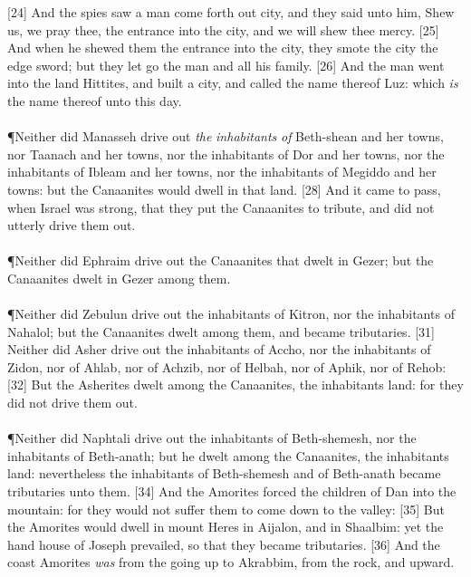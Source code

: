 [24] \textcolor[cmyk]{0.99998,1,0,0}{And the spies saw a man come forth out  city, and they said unto him, Shew us, we pray thee, the entrance into the city, and we will shew thee mercy.}
[25] \textcolor[cmyk]{0.99998,1,0,0}{And when he shewed them the entrance into the city, they smote the city  the edge  sword; but they let go the man and all his family.}
[26] \textcolor[cmyk]{0.99998,1,0,0}{And the man went into the land  Hittites, and built a city, and called the name thereof Luz: which \emph{is} the name thereof unto this day.}\\
\\
\P \textcolor[cmyk]{0.99998,1,0,0}{Neither did Manasseh drive out \emph{the} \emph{inhabitants} \emph{of} Beth-shean and her towns, nor Taanach and her towns, nor the inhabitants of Dor and her towns, nor the inhabitants of Ibleam and her towns, nor the inhabitants of Megiddo and her towns: but the Canaanites would dwell in that land.}
[28] \textcolor[cmyk]{0.99998,1,0,0}{And it came to pass, when Israel was strong, that they put the Canaanites to tribute, and did not utterly drive them out.}\\
\\
\P \textcolor[cmyk]{0.99998,1,0,0}{Neither did Ephraim drive out the Canaanites that dwelt in Gezer; but the Canaanites dwelt in Gezer among them.}\\
\\
\P \textcolor[cmyk]{0.99998,1,0,0}{Neither did Zebulun drive out the inhabitants of Kitron, nor the inhabitants of Nahalol; but the Canaanites dwelt among them, and became tributaries.}
[31] \textcolor[cmyk]{0.99998,1,0,0}{Neither did Asher drive out the inhabitants of Accho, nor the inhabitants of Zidon, nor of Ahlab, nor of Achzib, nor of Helbah, nor of Aphik, nor of Rehob:}
[32] \textcolor[cmyk]{0.99998,1,0,0}{But the Asherites dwelt among the Canaanites, the inhabitants  land: for they did not drive them out.}\\
\\
\P \textcolor[cmyk]{0.99998,1,0,0}{Neither did Naphtali drive out the inhabitants of Beth-shemesh, nor the inhabitants of Beth-anath; but he dwelt among the Canaanites, the inhabitants  land: nevertheless the inhabitants of Beth-shemesh and of Beth-anath became tributaries unto them.}
[34] \textcolor[cmyk]{0.99998,1,0,0}{And the Amorites forced the children of Dan into the mountain: for they would not suffer them to come down to the valley:}
[35] \textcolor[cmyk]{0.99998,1,0,0}{But the Amorites would dwell in mount Heres in Aijalon, and in Shaalbim: yet the hand  house of Joseph prevailed, so that they became tributaries.}
[36] \textcolor[cmyk]{0.99998,1,0,0}{And the coast  Amorites \emph{was} from the going up to Akrabbim, from the rock, and upward.}